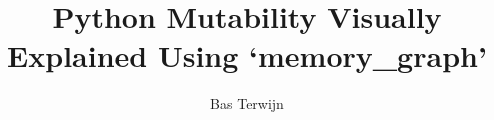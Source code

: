 \documentclass[10pt, colorlinks=true, urlcolor=blue]{beamer}
\title{Python Mutability Visually Explained Using `memory\_graph'}
\author{Bas Terwijn}
\date{}
\begin{document}
\begin{frame}
    \titlepage
\end{frame}


  

  


\end{document}
